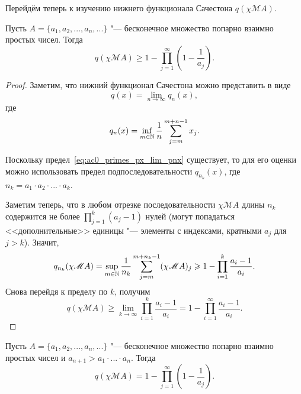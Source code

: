 Перейдём теперь к изучению нижнего функционала Сачестона $q(\chi\mathscr{M}A)$.

\begin{proposition}
	\label{thm:ac0_primes_p_psi_A_prod}
	Пусть $A = \{a_1, a_2, ..., a_n,...\}$ "--- бесконечное множество попарно взаимно простых чисел.
	Тогда
	\begin{equation}
		q(\chi\mathscr{M}A) \geq 1-\prod_{j=1}^\infty \left(1-\frac{1}{a_j}\right)
		.
	\end{equation}
\end{proposition}

\begin{proof}

	Заметим, что нижний функционал Сачестона можно представить в виде
	\begin{equation}
		\label{eq:ac0_primes_px_lim_pnx}
		q(x) = \lim_{n\to\infty} q_n(x)
		,
	\end{equation}
	где
	\begin{equation}
		q_n(x) = \inf_{m\in\mathbb{N}}  \frac{1}{n} \sum_{j=m}^{m+n-1} x_j
		.
	\end{equation}

	Поскольку предел~\eqref{eq:ac0_primes_px_lim_pnx} существует, то для его оценки можно использовать предел подпоследовательности
	$q_{n_k}(x)$, где $n_k = a_1\cdot a_2 \cdot ... \cdot a_k$.

	Заметим теперь, что в любом отрезке последовательности $\chi\mathscr{M}A$ длины $n_k$
	содержится не более $\prod_{j=1}^k (a_j-1)$ нулей
	(могут попадаться <<дополнительные>> единицы "--- элементы с индексами, кратными $a_j$ для $j>k$).
	Значит,
	\begin{equation}
		q_{n_k}(\chi\mathscr{M}A) =
		\sup_{m\in\mathbb{N}}  \frac{1}{n_k} \sum_{j=m}^{m+n_k-1} (\chi\mathscr{M}A)_j
		\geqslant
		1-\prod_{i=1}^k \frac{a_i-1}{a_i}
		.
	\end{equation}
	Снова перейдя к пределу по $k$, получим
	\begin{equation}
		\label{eq:ac0_primes_p_psi_A_upper_bound}
		q(\chi\mathscr{M}A) \geq \lim_{k\to \infty} \prod_{i=1}^k \frac{a_i-1}{a_i}
		=
		1-\prod_{i=1}^\infty \frac{a_i-1}{a_i}
		.
	\end{equation}

\end{proof}




\begin{corollary}
	\label{cor:ac0_primes_p_psi_A_prod}
	Пусть $A = \{a_1, a_2, ..., a_n,...\}$ "--- бесконечное множество попарно взаимно простых чисел
	и $a_{n+1}>a_1\cdot...\cdot a_n$.
	Тогда
	\begin{equation}
		q(\chi\mathscr{M}A) = 1-\prod_{j=1}^\infty \left(1-\frac{1}{a_j}\right)
		.
	\end{equation}
\end{corollary}


